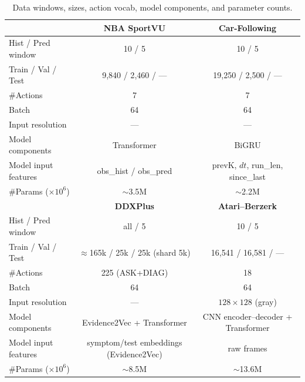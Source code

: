 \documentclass{article} %
\begin{document}
\begin{table}[t]
\centering
\small
\setlength{\tabcolsep}{6pt}
\renewcommand{\arraystretch}{1.15}
\caption{Data windows, sizes, action vocab, model components, and parameter counts.}
\label{tab:exp-params-data-model-T}
\begin{tabular}{lcc}
\toprule
 & \textbf{NBA SportVU} & \textbf{Car-Following} \\
\midrule
Hist / Pred window & 10 / 5 & 10 / 5 \\
Train / Val / Test & 9{,}840 / 2{,}460 / — & 19{,}250 / 2{,}500 / — \\
\#Actions & 7 & 7 \\
Batch & 64 & 64 \\
Input resolution & — & — \\
Model components & Transformer & BiGRU \\
Model input features & obs\_hist / obs\_pred & prevK, $dt$, run\_len, since\_last \\
\#Params ($\times 10^6$) & $\sim$3.5M & $\sim$2.2M \\
\midrule
 & \textbf{DDXPlus} & \textbf{Atari–Berzerk} \\
\midrule
Hist / Pred window & all / 5 & 10 / 5 \\
Train / Val / Test & $\approx$165k / 25k / 25k \newline (shard 5k) & 16{,}541 / 16{,}581 / — \\
\#Actions & 225 (ASK+DIAG) & 18 \\
Batch & 64 & 64 \\
Input resolution & — & $128{\times}128$ (gray) \\
Model components & Evidence2Vec + Transformer & CNN encoder–decoder + Transformer \\
Model input features & symptom/test embeddings (Evidence2Vec) & raw frames \\
\#Params ($\times 10^6$) & $\sim$8.5M & $\sim$13.6M \\
\bottomrule
\end{tabular}
\end{table}
\end{document}
